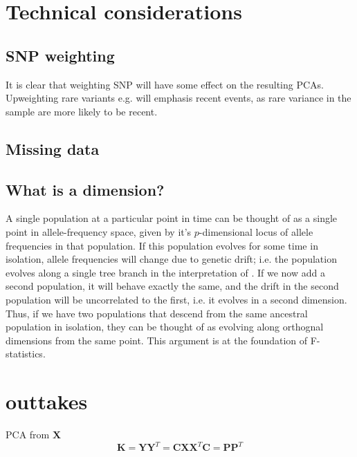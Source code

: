 \documentclass[10pt,a4paper]{article}
\newcommand{\MX}{\mathbf{X}} %
\newcommand{\MC}{\mathbf{C}} %
\newcommand{\MY}{\mathbf{Y}} %
\newcommand{\MP}{\mathbf{P}} %
\newcommand{\MK}{\mathbf{K}} %
\begin{document}
	
\section{Technical considerations}
	\subsection{SNP weighting}
	It is clear that weighting SNP will have some effect on the resulting PCAs. Upweighting rare variants e.g. will emphasis recent events, as rare variance in the sample are more likely to be recent.
	
	
	\subsection{Missing data}
	
	\subsection{What is a dimension?}
	A single population at a particular point in time can be thought of as a single point in allele-frequency space, given by it's $p$-dimensional locus of allele frequencies in that population. If this population evolves for some time in isolation, allele frequencies will change due to genetic drift; i.e. the population evolves along a single tree branch in the interpretation of \cite{patterson2012}. If we now add a second population, it will behave exactly the same, and the drift in the second population will be uncorrelated to the first, i.e. it evolves in a second dimension. Thus, if we have two populations that descend from the same ancestral population in isolation, they can be thought of as evolving along orthognal dimensions from the same point. This argument is at the foundation of F-statistics.
	
	
	\section{outtakes}
	PCA from $\MX$
	\begin{equation}
	\MK = \MY \MY^T = \MC\MX\MX^T \MC = \MP\MP^T
	\end{equation}

\appendix
\end{document}
